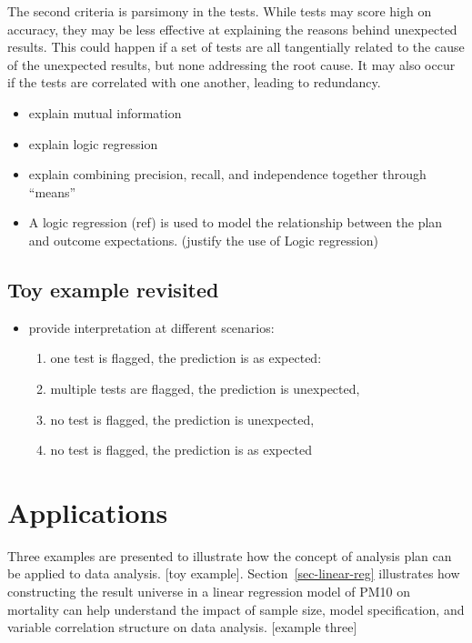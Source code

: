 \documentclass[
]{jds}
\providecommand{\tightlist}{%
  \setlength{\itemsep}{0pt}\setlength{\parskip}{0pt}}\usepackage{longtable,booktabs,array}
\begin{document}
The second criteria is parsimony in the tests. While tests may score
high on accuracy, they may be less effective at explaining the reasons
behind unexpected results. This could happen if a set of tests are all
tangentially related to the cause of the unexpected results, but none
addressing the root cause. It may also occur if the tests are correlated
with one another, leading to redundancy.

\begin{itemize}
\item
  explain mutual information
\item
  explain logic regression
\item
  explain combining precision, recall, and independence together through
  ``means''
\item
  A logic regression (ref) is used to model the relationship between the
  plan and outcome expectations. (justify the use of Logic regression)
\end{itemize}

\subsection{Toy example revisited}\label{toy-example-revisited}

\begin{itemize}
\item
  provide interpretation at different scenarios:

  \begin{enumerate}
  \def\labelenumi{\arabic{enumi})}
  \tightlist
  \item
    one test is flagged, the prediction is as expected:
  \item
    multiple tests are flagged, the prediction is unexpected,
  \item
    no test is flagged, the prediction is unexpected,
  \item
    no test is flagged, the prediction is as expected
  \end{enumerate}
\end{itemize}

\section{Applications}\label{sec-examples}

Three examples are presented to illustrate how the concept of analysis
plan can be applied to data analysis. {[}toy example{]}.
Section~\ref{sec-linear-reg} illustrates how constructing the result
universe in a linear regression model of PM10 on mortality can help
understand the impact of sample size, model specification, and variable
correlation structure on data analysis. {[}example three{]}
\end{document}
